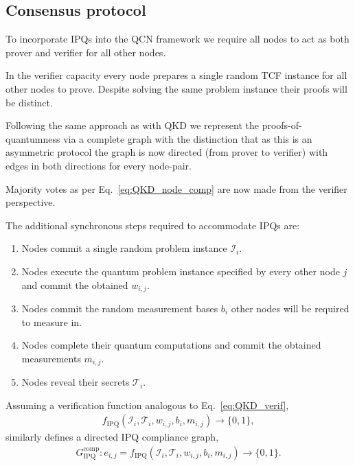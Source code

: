 \subsection{Consensus protocol}

To incorporate IPQs into the QCN framework we require all nodes to act as both prover and verifier for all other nodes.

In the verifier capacity every node prepares a single random TCF instance for all other nodes to prove. Despite solving the same problem instance their proofs will be distinct.

Following the same approach as with QKD we represent the proofs-of-quantumness via a complete graph with the distinction that as this is an asymmetric protocol the graph is now directed (from prover to verifier) with edges in both directions for every node-pair.

Majority votes as per Eq.~\eqref{eq:QKD_node_comp} are now made from the verifier perspective.

The additional synchronous steps required to accommodate IPQs are:
\begin{enumerate}
	\item Nodes commit a single random problem instance $\mathcal{I}_i$.
	\item Nodes execute the quantum problem instance specified by every other node $j$ and commit the obtained $w_{i,j}$.
	\item Nodes commit the random measurement bases $b_i$ other nodes will be required to measure in.
	\item Nodes complete their quantum computations and commit the obtained measurements $m_{i,j}$.
	\item Nodes reveal their secrets $\mathcal{T}_i$.
\end{enumerate}

Assuming a verification function analogous to Eq.~\eqref{eq:QKD_verif},
\begin{align}
	f_\mathrm{IPQ}(\mathcal{I}_i,\mathcal{T}_i,w_{i,j},b_i,m_{i,j}) \to \{0,1\},
\end{align}
similarly defines a directed IPQ compliance graph,
\begin{align}
	G_\mathrm{IPQ}^{\mathrm{comp}}: e_{i,j} = f_\mathrm{IPQ}(\mathcal{I}_i,\mathcal{T}_i,w_{i,j},b_i,m_{i,j}) \to \{0,1\}.
\end{align}


